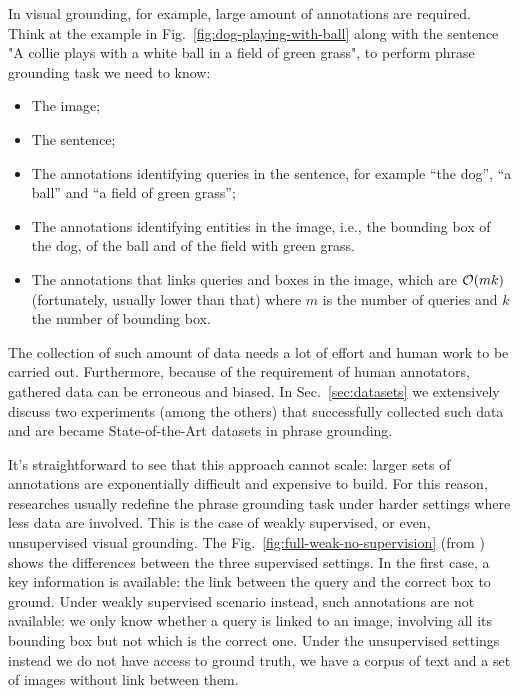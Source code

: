 In visual grounding, for example, large amount of annotations are
required. Think at the example in Fig.~\ref{fig:dog-playing-with-ball}
along with the sentence "A collie plays with a white ball in a field
of green grass", to perform phrase grounding task we need to know: 
\begin{itemize}
  \item The image;
  \item The sentence;
  \item The annotations identifying queries in the sentence, for
  example ``the dog'', ``a ball'' and ``a field of green grass'';
  \item The annotations identifying entities in the image, i.e., the
  bounding box of the dog, of the ball and of the field with green
  grass.
  \item The annotations that links queries and boxes in the image,
  which are $\mathcal{O}(mk)$ (fortunately, usually lower than that) where
  $m$ is the number of queries and $k$ the number of bounding box.
\end{itemize}
The collection of such amount of data needs a lot of effort and human
work to be carried out. Furthermore, because of the requirement of
human annotators, gathered data can be erroneous and biased. In
Sec.~\ref{sec:datasets} we extensively discuss two experiments (among
the others) that successfully collected such data and are became
State-of-the-Art datasets in phrase grounding.

It's straightforward to see that this approach cannot scale: larger
sets of annotations are exponentially difficult and expensive to
build. For this reason, researches usually redefine the phrase
grounding task under harder settings where less data are involved.
This is the case of weakly supervised, or even, unsupervised visual
grounding. The Fig.~\ref{fig:full-weak-no-supervision} (from
\cite{wang2019phrase}) shows the differences between the three
supervised settings. In the first case, a key information is
available: the link between the query and the correct box to ground.
Under weakly supervised scenario instead, such annotations are not
available: we only know whether a query is linked to an image,
involving all its bounding box but not which is the correct one. Under
the unsupervised settings instead we do not have access to ground
truth, we have a corpus of text and a set of images without link
between them.

